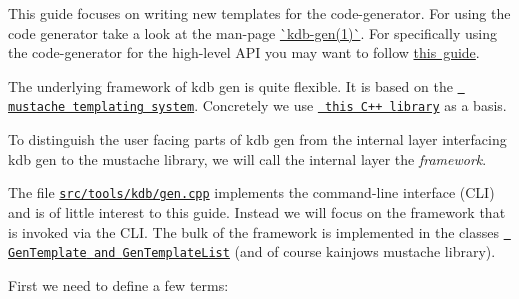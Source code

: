 This guide focuses on writing new templates for the code-\/generator. For using the code generator take a look at the man-\/page \mbox{\hyperlink{doc_help_kdb-gen_md}{\`{}kdb-\/gen(1)\`{}}}. For specifically using the code-\/generator for the high-\/level A\+PI you may want to follow \mbox{\hyperlink{doc_tutorials_highlevel_md}{this guide}}.

The underlying framework of {\ttfamily kdb gen} is quite flexible. It is based on the \href{https://mustache.github.io/}{\texttt{ mustache templating system}}. Concretely we use \href{https://github.com/kainjow/Mustache}{\texttt{ this C++ library}} as a basis.

To distinguish the user facing parts of {\ttfamily kdb gen} from the internal layer interfacing {\ttfamily kdb gen} to the mustache library, we will call the internal layer the {\itshape framework}.

The file \href{/home/mpranj/workspace/libelektra/src/tools/kdb/gen.cpp}{\texttt{ {\ttfamily src/tools/kdb/gen.\+cpp}}} implements the command-\/line interface (C\+LI) and is of little interest to this guide. Instead we will focus on the framework that is invoked via the C\+LI. The bulk of the framework is implemented in the classes \href{/home/mpranj/workspace/libelektra/src/tools/kdb/gen/template.hpp}{\texttt{ {\ttfamily Gen\+Template} and {\ttfamily Gen\+Template\+List}}} (and of course kainjow\textquotesingle{}s mustache library).

First we need to define a few terms\+:


